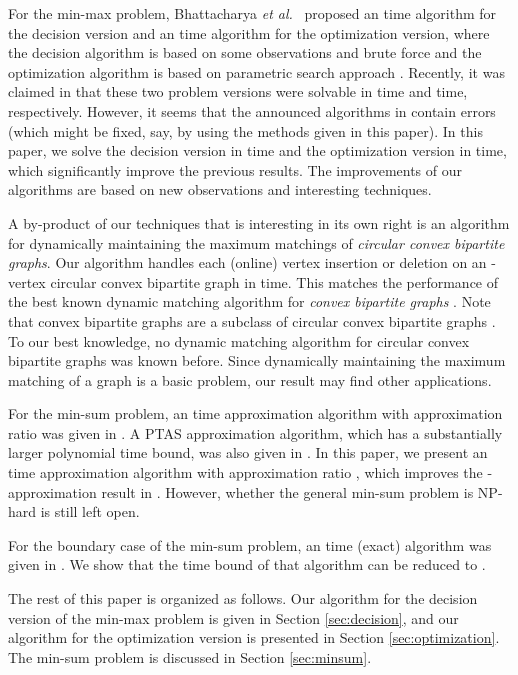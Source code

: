 \documentclass[11pt]{article}
\begin{document}
For the min-max problem, Bhattacharya {\em et al.}~\cite{ref:BhattacharyaOp09}
proposed an  time algorithm
for the decision version and an  time algorithm
for the optimization version, where the decision algorithm is
based on some observations and brute force and the optimization
algorithm is based on parametric search approach
\cite{ref:ColeSl87,ref:MegiddoAp83}.
Recently, it was claimed in \cite{ref:TanNe10} that these two
problem versions were solvable in  time and
 time, respectively. However, it seems that the
announced algorithms in \cite{ref:TanNe10} contain errors (which
might be fixed, say, by using the methods given in this paper).
In this paper, we solve the decision version in  time and the
optimization version in  time, which significantly
improve the previous results. The improvements of our algorithms are
based on new observations and interesting techniques.


A by-product of our techniques that is interesting in its own right
is an algorithm for dynamically maintaining the maximum matchings of
{\em circular convex bipartite graphs}. Our
algorithm handles each (online) vertex insertion or deletion on
an -vertex circular convex bipartite graph in  time.
This matches the performance of the best known
dynamic matching algorithm for {\em convex bipartite graphs}
\cite{ref:BrodalDy07}. Note that convex bipartite graphs are a subclass of
circular convex bipartite graphs \cite{ref:LiangCi95}.  To our best knowledge,
no dynamic matching algorithm for circular convex bipartite graphs was known before.
Since dynamically maintaining the maximum
matching of a graph is a basic problem, our result
may find other applications.



For the min-sum problem, an  time approximation algorithm with approximation
ratio  was given in \cite{ref:BhattacharyaOp09}. A PTAS approximation
algorithm, which has a substantially larger polynomial time bound,
was also given in \cite{ref:BhattacharyaOp09}. In this paper,
we present an  time approximation algorithm with approximation
ratio , which improves the -approximation result in
\cite{ref:BhattacharyaOp09}. However, whether the general min-sum problem is
NP-hard is still left open.

For the boundary case of the min-sum problem, an  time
(exact) algorithm was given in \cite{ref:TanNe10}. We show that the
time bound of that algorithm can be reduced to .

The rest of this paper is organized as follows. Our algorithm for the
decision version of the min-max problem is given in Section
\ref{sec:decision}, and our algorithm for the optimization version
is presented in Section \ref{sec:optimization}. The min-sum problem
is discussed in Section \ref{sec:minsum}.
\end{document}
